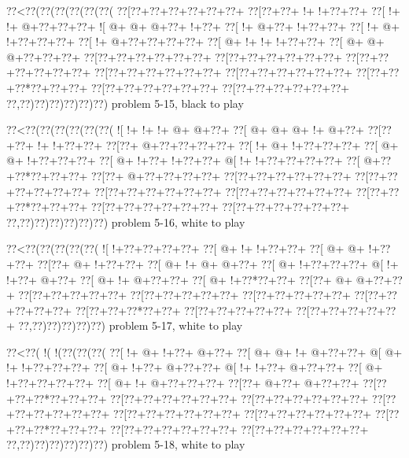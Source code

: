 \vbox{\vbox{\goo
\0??<\0??(\0??(\0??(\0??(\0??(\0??(
\0??[\0??+\0??+\0??+\0??+\0??+\0??+
\0??[\0??+\0??+\- !+\- !+\0??+\0??+
\0??[\- !+\- !+\- @+\0??+\0??+\0??+
\- ![\- @+\- @+\- @+\0??+\- !+\0??+
\0??[\- !+\- @+\0??+\- !+\0??+\0??+
\0??[\- !+\- @+\- !+\0??+\0??+\0??+
\0??[\- !+\- @+\0??+\0??+\0??+\0??+
\0??[\- @+\- !+\- !+\- !+\0??+\0??+
\0??[\- @+\- @+\- @+\0??+\0??+\0??+
\0??[\0??+\0??+\0??+\0??+\0??+\0??+
\0??[\0??+\0??+\0??+\0??+\0??+\0??+
\0??[\0??+\0??+\0??+\0??+\0??+\0??+
\0??[\0??+\0??+\0??+\0??+\0??+\0??+
\0??[\0??+\0??+\0??+\0??+\0??+\0??+
\0??[\0??+\0??+\0??*\0??+\0??+\0??+
\0??[\0??+\0??+\0??+\0??+\0??+\0??+
\0??[\0??+\0??+\0??+\0??+\0??+\0??+
\0??,\0??)\0??)\0??)\0??)\0??)\0??)
}
\hfil problem 5-15, black to play\hfil\break
}

\vbox{\vbox{\goo
\0??<\0??(\0??(\0??(\0??(\0??(\0??(
\- ![\- !+\- !+\- !+\- @+\- @+\0??+
\0??[\- @+\- @+\- @+\- !+\- @+\0??+
\0??[\0??+\0??+\- !+\- !+\0??+\0??+
\0??[\0??+\- @+\0??+\0??+\0??+\0??+
\0??[\- !+\- @+\- !+\0??+\0??+\0??+
\0??[\- @+\- @+\- !+\0??+\0??+\0??+
\0??[\- @+\- !+\0??+\- !+\0??+\0??+
\- @[\- !+\- !+\0??+\0??+\0??+\0??+
\0??[\- @+\0??+\0??*\0??+\0??+\0??+
\0??[\0??+\- @+\0??+\0??+\0??+\0??+
\0??[\0??+\0??+\0??+\0??+\0??+\0??+
\0??[\0??+\0??+\0??+\0??+\0??+\0??+
\0??[\0??+\0??+\0??+\0??+\0??+\0??+
\0??[\0??+\0??+\0??+\0??+\0??+\0??+
\0??[\0??+\0??+\0??*\0??+\0??+\0??+
\0??[\0??+\0??+\0??+\0??+\0??+\0??+
\0??[\0??+\0??+\0??+\0??+\0??+\0??+
\0??,\0??)\0??)\0??)\0??)\0??)\0??)
}
\hfil problem 5-16, white to play\hfil\break
}

\vbox{\vbox{\goo
\0??<\0??(\0??(\0??(\0??(\0??(
\- ![\- !+\0??+\0??+\0??+\0??+
\0??[\- @+\- !+\- !+\0??+\0??+
\0??[\- @+\- @+\- !+\0??+\0??+
\0??[\0??+\- @+\- !+\0??+\0??+
\0??[\- @+\- !+\- @+\- @+\0??+
\0??[\- @+\- !+\0??+\0??+\0??+
\- @[\- !+\- !+\0??+\- @+\0??+
\0??[\- @+\- !+\- @+\0??+\0??+
\0??[\- @+\- !+\0??*\0??+\0??+
\0??[\0??+\- @+\- @+\0??+\0??+
\0??[\0??+\0??+\0??+\0??+\0??+
\0??[\0??+\0??+\0??+\0??+\0??+
\0??[\0??+\0??+\0??+\0??+\0??+
\0??[\0??+\0??+\0??+\0??+\0??+
\0??[\0??+\0??+\0??*\0??+\0??+
\0??[\0??+\0??+\0??+\0??+\0??+
\0??[\0??+\0??+\0??+\0??+\0??+
\0??,\0??)\0??)\0??)\0??)\0??)
}
\hfil problem 5-17, white to play\hfil\break
}

\vbox{\vbox{\goo
\0??<\0??(\- !(\- !(\0??(\0??(\0??(
\0??[\- !+\- @+\- !+\0??+\- @+\0??+
\0??[\- @+\- @+\- !+\- @+\0??+\0??+
\- @[\- @+\- !+\- !+\0??+\0??+\0??+
\0??[\- @+\- !+\0??+\- @+\0??+\0??+
\- @[\- !+\- !+\0??+\- @+\0??+\0??+
\0??[\- @+\- !+\0??+\0??+\0??+\0??+
\0??[\- @+\- !+\- @+\0??+\0??+\0??+
\0??[\0??+\- @+\0??+\- @+\0??+\0??+
\0??[\0??+\0??+\0??*\0??+\0??+\0??+
\0??[\0??+\0??+\0??+\0??+\0??+\0??+
\0??[\0??+\0??+\0??+\0??+\0??+\0??+
\0??[\0??+\0??+\0??+\0??+\0??+\0??+
\0??[\0??+\0??+\0??+\0??+\0??+\0??+
\0??[\0??+\0??+\0??+\0??+\0??+\0??+
\0??[\0??+\0??+\0??*\0??+\0??+\0??+
\0??[\0??+\0??+\0??+\0??+\0??+\0??+
\0??[\0??+\0??+\0??+\0??+\0??+\0??+
\0??,\0??)\0??)\0??)\0??)\0??)\0??)
}
\hfil problem 5-18, white to play\hfil\break
}

